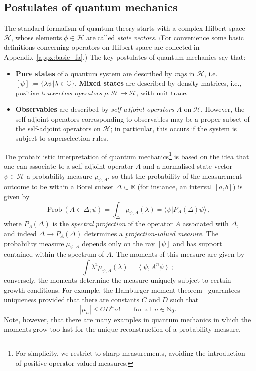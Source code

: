 \documentclass[12pt]{article}
\newcommand{\1}{\mathds{1}}                         %
\newcommand{\NN}{\mathbb{N}}          %
\newcommand{\RR}{\mathbb{R}}           %
\newcommand{\Hcal}{\mathcal {H}}
\newcommand{\C}{\mathbb{C}}
\newcommand{\ip}[2]{\langle #1|#2\rangle}
\DeclareMathOperator{\Prob}{Prob}
\begin{document}
\subsection{Postulates of quantum mechanics}\label{sec:PosQM}
The standard formalism of quantum theory starts with a complex Hilbert space $\Hcal$, whose elements $\phi\in\Hcal$ are called \textit{state vectors}. (For convenience some basic definitions concerning operators on Hilbert space are collected in Appendix~\ref{appx:basic_fa}.)
The key postulates of quantum mechanics say that:
\begin{itemize}
\item \textbf{Pure states} of a quantum system are described by \textit{rays} in $\Hcal$, i.e. $[\psi]:=\{\lambda \psi|\lambda\in\C\}$. \textbf{Mixed states} are described by density matrices, i.e., positive \textit{trace-class operators} $\rho:\Hcal\rightarrow\Hcal$, with unit trace. 
\item \textbf{Observables} are described by \textit{self-adjoint operators} $A$ on $\Hcal$. However, the self-adjoint operators corresponding to observables may be a proper subset of the self-adjoint operators on $\Hcal$; in particular, this occurs if the system is subject to superselection rules.
\end{itemize}


The probabilistic interpretation of quantum mechanics\footnote{For simplicity, we restrict to sharp measurements, avoiding the introduction of positive operator valued measures.} is based on the idea that one can associate to a self-adjoint operator $A$ and a normalised state vector $\psi\in\Hcal$ a probability measure $\mu_{\psi,A}$, so that the probability of the measurement outcome to be within a Borel subset $\Delta\subset\RR$ (for instance, an interval $[a,b]$) is given by 
\[
\Prob(A\in\Delta;\psi)=\int_\Delta\mu_{\psi,A}(\lambda)= \ip{\psi}{P_{A}(\Delta)\psi}\,,
\]
where $P_{A}(\Delta)$ is the \emph{spectral projection} of the operator $A$ associated with $\Delta$, and indeed $\Delta\to P_{A}(\Delta)$ determines a \emph{projection-valued measure}. The probability measure $\mu_{\psi,A}$ depends only on the ray $[\psi]$ and has support contained within the spectrum of $A$. 
The moments of this measure are given by
\[
\int \lambda^n\mu_{\psi,A}(\lambda)= \left<\psi,A^n\psi\right>\,;
\] 
conversely, the moments determine the measure uniquely subject to certain growth conditions. For example, the Hamburger moment theorem~\cite{Simon:1998} guarantees uniqueness provided that there are constants $C$ and $D$ such that
\begin{equation}
|\mu_n|\le C D^n n!\qquad\text{for all $n\in\NN_0$.}
\end{equation} 
Note, however, that
there are many examples in quantum mechanics in which the moments grow too fast for the unique reconstruction of a probability measure. 
\end{document}
